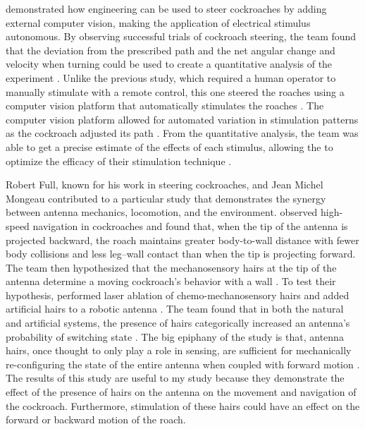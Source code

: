 \citet{whitmire2013kinect} demonstrated how engineering can be used to steer cockroaches by adding external computer vision, making the application of electrical stimulus autonomous. By observing successful trials of cockroach steering, the team found that the deviation from the prescribed path and the net angular change and velocity when turning could be used to create a quantitative analysis of the experiment \citep{whitmire2013kinect}. Unlike the previous study, which required a human operator to manually stimulate with a remote control, this one steered the roaches using a computer vision platform that automatically stimulates the roaches \citep{whitmire2013kinect}. The computer vision platform allowed for automated variation in stimulation patterns as the cockroach adjusted its path \citep{whitmire2013kinect}. From the quantitative analysis, the team was able to get a precise estimate of the effects of each stimulus, allowing the to optimize the efficacy of their stimulation technique \citep{whitmire2013kinect}. 

Robert Full, known for his work in steering cockroaches, and Jean Michel Mongeau contributed to a particular study that demonstrates the synergy between antenna mechanics, locomotion, and the environment. \citet{Mongeau2014} observed high-speed navigation in cockroaches and found that, when the tip of the antenna is projected backward, the roach maintains greater body-to-wall distance with fewer body collisions and less leg–wall contact than when the tip is projecting forward. The team then hypothesized that the mechanosensory hairs at the tip of the antenna determine a moving cockroach's behavior with a wall \citep{Mongeau2014}. To test their hypothesis, \citep{Mongeau2014} performed laser ablation of chemo-mechanosensory hairs and added artificial hairs to a robotic antenna \citep{Mongeau2014}. The team found that in both the natural and artificial systems, the presence of hairs categorically increased an antenna’s probability of switching state \citep{Mongeau2014}. The big epiphany of the study is that, antenna hairs, once thought to only play a role in sensing, are sufficient for mechanically re-configuring the state of the entire antenna when coupled with forward motion \citep{Mongeau2014}. The results of this study are useful to my study because they demonstrate the effect of the presence of hairs on the antenna on the movement and navigation of the cockroach. Furthermore, stimulation of these hairs could have an effect on the forward or backward motion of the roach.

